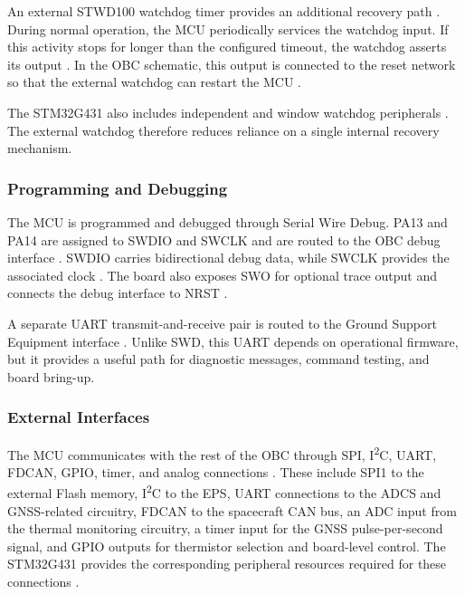 \documentclass[10pt]{../datasheet}
\begin{document}
An external STWD100 watchdog timer provides an additional recovery path
\cite{obc-schematic}. During normal operation, the MCU periodically services
the watchdog input. If this activity stops for longer than the configured
timeout, the watchdog asserts its output \cite{stwd100-datasheet}. In the OBC
schematic, this output is connected to the reset network so that the external
watchdog can restart the MCU \cite{obc-schematic,stwd100-datasheet}.

The STM32G431 also includes independent and window watchdog peripherals
\cite{stm32g431-datasheet}. The external watchdog therefore reduces reliance
on a single internal recovery mechanism.

\subsubsection{Programming and Debugging}

The MCU is programmed and debugged through Serial Wire Debug. PA13 and PA14 are
assigned to SWDIO and SWCLK and are routed to the OBC debug interface
\cite{stm32g431-datasheet,obc-schematic}. SWDIO carries bidirectional debug
data, while SWCLK provides the associated clock \cite{arm-swd}. The board also
exposes SWO for optional trace output and connects the debug interface to NRST
\cite{stm32g431-datasheet,obc-schematic}.

A separate UART transmit-and-receive pair is routed to the Ground Support
Equipment interface \cite{obc-schematic}. Unlike SWD, this UART depends on
operational firmware, but it provides a useful path for diagnostic messages,
command testing, and board bring-up.

\subsubsection{External Interfaces}

The MCU communicates with the rest of the OBC through SPI,
I\textsuperscript{2}C, UART, FDCAN, GPIO, timer, and analog connections
\cite{obc-schematic}. These include SPI1 to the external Flash memory,
I\textsuperscript{2}C to the EPS, UART connections to the ADCS and GNSS-related
circuitry, FDCAN to the spacecraft CAN bus, an ADC input from the thermal
monitoring circuitry, a timer input for the GNSS pulse-per-second signal, and
GPIO outputs for thermistor selection and board-level control. The STM32G431
provides the corresponding peripheral resources required for these connections
\cite{stm32g431-datasheet}.
\end{document}

